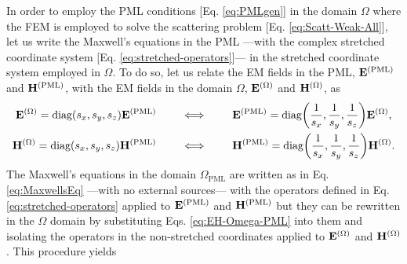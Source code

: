    In order to employ the PML conditions [Eq. \eqref{eq:PMLgen}] in the domain $\Omega$ where the FEM is employed to solve the scattering problem [Eq. \eqref{eq:Scatt-Weak-All}], let us write the Maxwell's equations in the PML ---with the complex stretched coordinate system [Eq. \eqref{eq:stretched-operators}]--- in the stretched coordinate system employed in $\Omega$. To do so, let us relate the EM fields in the PML, $\vb{E}^\text{(PML)}$ and $\vb{H}^\text{(PML)}$, with the EM fields in the domain $\Omega$, $\vb{E}^{(\Omega)}$ and $\vb{H}^{(\Omega)}$,  as \cite{jin_theory_2010}
   \begin{subequations}
       \label{eq:EH-Omega-PML}
   \begin{align}
        \vb{E}^{(\Omega)} = \text{diag}(s_x,s_y,s_z)\vb{E}^\text{(PML)}
            \qquad
            &\iff
            \qquad
         \vb{E}^\text{(PML)} = \text{diag}\qty(\frac{1}{s_x},\frac{1}{s_y},\frac{1}{s_z})\vb{E}^{(\Omega)},
       \label{eq:E-Omega-PML}
    \\
       \vb{H}^{(\Omega)} = \text{diag}(s_x,s_y,s_z)\vb{H}^\text{(PML)}
            \qquad
             &\iff
            \qquad
       \vb{H}^\text{(PML)} = \text{diag}\qty(\frac{1}{s_x},\frac{1}{s_y},\frac{1}{s_z})\vb{H}^{(\Omega)}.
       \label{eq:H-Omega-PML}
   \end{align}
    \end{subequations}
    The Maxwell's equations in the domain $\Omega_\text{PML}$ are written as in Eq. \eqref{eq:MaxwellsEq} ---with no external sources--- with the operators defined in Eq. \eqref{eq:stretched-operators} applied to $\vb{E}^\text{(PML)}$ and $\vb{H}^\text{(PML)}$ but they can be rewritten in the $\Omega$ domain by substituting  Eqs. \eqref{eq:EH-Omega-PML} into them and isolating the operators in the non-stretched coordinates applied to $\vb{E}^{(\Omega)}$ and $\vb{H}^{(\Omega)}$. This procedure yields \cite{jin_theory_2010}

